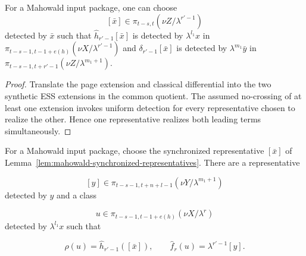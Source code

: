 \begin{lemma}
  \label{lem:mahowald-synchronized-representatives}
  \notready
  For a Mahowald input package, one can choose
  \[
    [\bar x]\in\pi_{t-s,t}(\nu Z/\lambda^{r'-1})
  \]
  detected by $\bar x$ such that
  $\widehat h_{r'-1}[\bar x]$ is detected by
  $\lambda^{l_1}x$ in
  $\pi_{t-s-1,t-1+e(h)}(\nu X/\lambda^{r'-1})$ and
  $\delta_{r'-1}[\bar x]$ is detected by
  $\lambda^{m_1}\bar y$ in
  $\pi_{t-s-1,t+r'-1}(\nu Z/\lambda^{m_1+1})$.
\end{lemma}

\begin{proof}
  Translate the page extension and classical differential into the two
  synthetic ESS extensions in the common quotient.  The assumed no-crossing
  of at least one extension invokes uniform detection for every representative
  chosen to realize the other.  Hence one representative realizes both
  leading terms simultaneously.
\end{proof}

\begin{lemma}
  \label{lem:mahowald-compatible-quotient-lift}
  \notready
  For a Mahowald input package, choose the synchronized representative
  $[\bar x]$ of Lemma~\ref{lem:mahowald-synchronized-representatives}.
  There are a representative

  \[
    [y]\in\pi_{t-s-1,t+n+l-1}(\nu Y/\lambda^{m_1+1})
  \]
  detected by $y$ and a class

  \[
    u\in\pi_{t-s-1,t-1+e(h)}(\nu X/\lambda^r)
  \]
  detected by $\lambda^{l_1}x$ such that

  \[
    \rho(u)=\widehat h_{r'-1}([\bar x]),
    \qquad
    \widehat f_r(u)=\lambda^{r'-1}[y].
  \]
\end{lemma}

